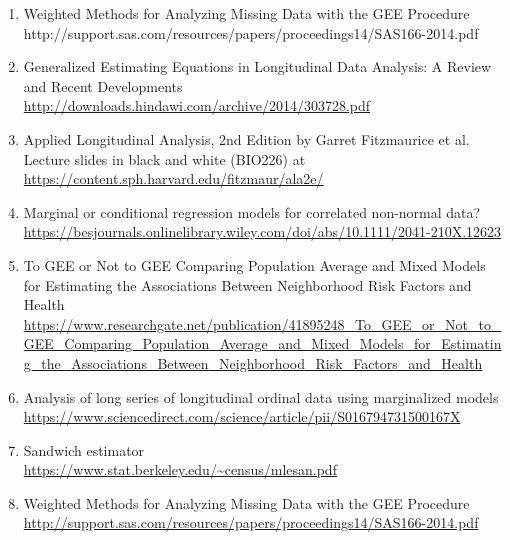 \documentclass[letterpaper,11pt]{article}
\begin{document}
\begin{enumerate}

\item Weighted Methods for Analyzing Missing Data with the GEE Procedure \\
{http://support.sas.com/resources/papers/proceedings14/SAS166-2014.pdf}

\item Generalized Estimating Equations in Longitudinal Data Analysis: A Review and Recent Developments\\
		\url{http://downloads.hindawi.com/archive/2014/303728.pdf}

\item Applied Longitudinal Analysis, 2nd Edition by Garret Fitzmaurice et al.\\
	Lecture slides in black and white (BIO226) at\\
	\url{https://content.sph.harvard.edu/fitzmaur/ala2e/} 

\item Marginal or conditional regression models for correlated non-normal data?\\
	\url{https://besjournals.onlinelibrary.wiley.com/doi/abs/10.1111/2041-210X.12623}

\item To GEE or Not to GEE Comparing Population Average and Mixed Models for Estimating the Associations Between Neighborhood Risk Factors and Health\\
	\url{https://www.researchgate.net/publication/41895248_To_GEE_or_Not_to_GEE_Comparing_Population_Average_and_Mixed_Models_for_Estimating_the_Associations_Between_Neighborhood_Risk_Factors_and_Health}

\item Analysis of long series of longitudinal ordinal data using marginalized models\\
	\url{https://www.sciencedirect.com/science/article/pii/S016794731500167X}
	
\item Sandwich estimator\\
		\url{https://www.stat.berkeley.edu/~census/mlesan.pdf}

\item Weighted Methods for Analyzing Missing Data with the GEE Procedure\\
	\url{http://support.sas.com/resources/papers/proceedings14/SAS166-2014.pdf}
\end{enumerate}

\end{document}
